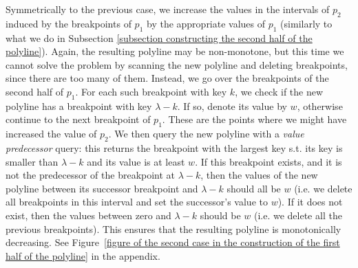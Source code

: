 \documentclass[a4paper,UKenglish]{lipics-v2016}
\theoremstyle{plain}
\begin{document}
\vspace{0.04in} 
Symmetrically to the previous case, we increase the values in the intervals of $p_2$ induced by the breakpoints of $p_1$ by the appropriate values of $p_{1}$ (similarly to what we do in Subsection \ref{subsection constructing the second half of the polyline}). Again, the resulting polyline may be non-monotone, but this time we cannot solve the problem by scanning the new polyline and deleting breakpoints, since there are too many of them. Instead, we go over the breakpoints of the second half of $p_1$. For each such breakpoint  with key $k$, we check if the new polyline has a breakpoint with key $\lambda - k$. If so, denote its value by $w$, otherwise continue to the next breakpoint of $p_1$. These are the points where we might have increased the value of $p_2$. We then query the new polyline with a \emph{value predecessor} query: this returns the breakpoint with the largest key s.t. its key is smaller than $\lambda - k$ and its value is at least $w$. 
%
If this breakpoint exists, and it is not the predecessor of the breakpoint at $\lambda - k$, then the values of the new polyline between its successor breakpoint and $\lambda - k$ should all be $w$ (i.e. we delete all breakpoints in this interval and set the successor's value to $w$). %
If it does not exist, then the values between zero and $\lambda - k$ should be $w$ (i.e. we delete all the previous breakpoints). 
This ensures that the resulting polyline is monotonically decreasing. 
See  Figure~\ref{figure of the second case in the construction of the first half of the polyline} in the appendix.



\end{document}

